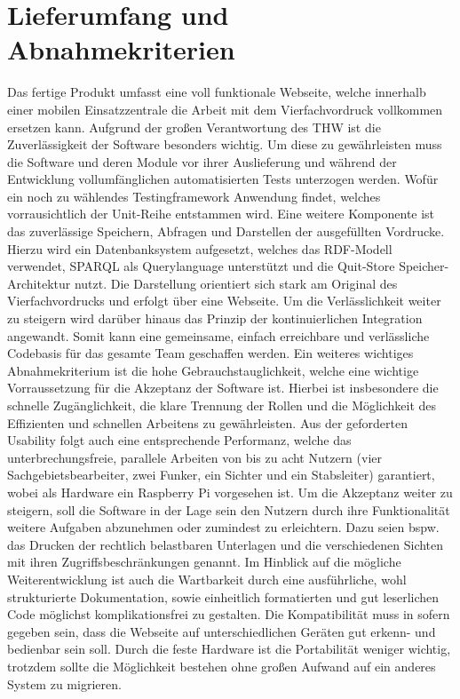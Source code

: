 \section{Lieferumfang und Abnahmekriterien}
Das fertige Produkt umfasst eine voll funktionale Webseite, welche innerhalb einer mobilen Einsatzzentrale die Arbeit mit dem Vierfachvordruck vollkommen ersetzen kann. Aufgrund der großen Verantwortung des THW ist die Zuverlässigkeit der Software besonders wichtig. Um diese zu gewährleisten muss die Software und deren Module vor ihrer Auslieferung und während der Entwicklung vollumfänglichen automatisierten Tests unterzogen werden. Wofür ein noch zu wählendes Testingframework Anwendung findet, welches vorrausichtlich der Unit-Reihe entstammen wird. Eine weitere Komponente ist das zuverlässige Speichern, Abfragen und Darstellen der ausgefüllten Vordrucke. Hierzu wird ein Datenbanksystem aufgesetzt, welches das RDF-Modell verwendet, SPARQL als Querylanguage unterstützt und die Quit-Store Speicher-Architektur nutzt. Die Darstellung orientiert sich stark am Original des Vierfachvordrucks und erfolgt über eine Webseite. Um die Verlässlichkeit weiter zu steigern wird darüber hinaus das Prinzip der kontinuierlichen Integration angewandt. Somit kann eine gemeinsame, einfach erreichbare und verlässliche Codebasis für das gesamte Team geschaffen werden. Ein weiteres wichtiges Abnahmekriterium ist die hohe Gebrauchstauglichkeit, welche eine wichtige Vorraussetzung für die Akzeptanz der Software ist. Hierbei ist insbesondere die schnelle Zugänglichkeit, die klare Trennung der Rollen und die Möglichkeit des Effizienten und schnellen Arbeitens zu gewährleisten. Aus der geforderten Usability folgt auch eine entsprechende Performanz, welche das unterbrechungsfreie, parallele Arbeiten von bis zu acht Nutzern (vier Sachgebietsbearbeiter, zwei Funker, ein Sichter und ein Stabsleiter) garantiert, wobei als Hardware ein Raspberry Pi vorgesehen ist. Um die Akzeptanz weiter zu steigern, soll die Software in der Lage sein den Nutzern durch ihre Funktionalität weitere Aufgaben abzunehmen oder zumindest zu erleichtern. Dazu seien bspw. das Drucken der rechtlich belastbaren Unterlagen und die verschiedenen Sichten mit ihren Zugriffsbeschränkungen genannt. Im Hinblick auf die mögliche Weiterentwicklung ist auch die Wartbarkeit durch eine ausführliche, wohl strukturierte Dokumentation, sowie einheitlich formatierten und gut leserlichen Code möglichst komplikationsfrei zu gestalten. Die Kompatibilität muss in sofern gegeben sein, dass die Webseite auf unterschiedlichen Geräten gut erkenn- und bedienbar sein soll. Durch die feste Hardware ist die Portabilität weniger wichtig, trotzdem sollte die Möglichkeit bestehen ohne großen Aufwand auf ein anderes System zu migrieren. 